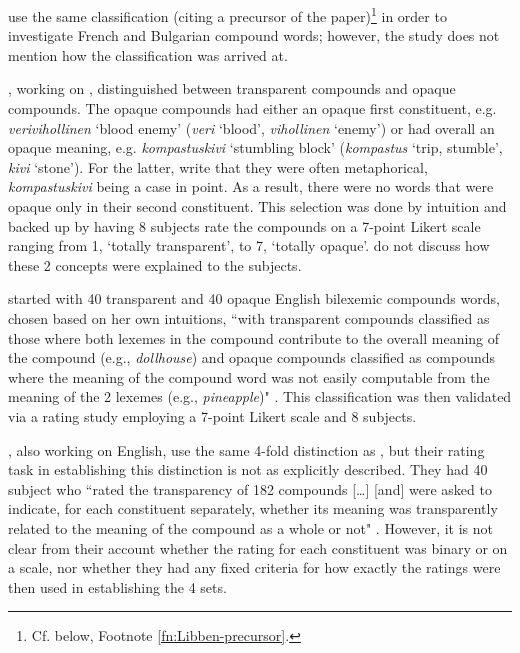 \citet{Jaremaetal:1999} use the same classification (citing a precursor of
the \citet{Libbenetal:2003} paper)\footnote{Cf. below, Footnote \ref{fn:Libben-precursor}.}
in order to investigate
French and Bulgarian compound words; however, the study does not mention how
the classification was arrived at.

\citet{PollatsekandHyona:2005}, working on , distinguished between transparent compounds and
opaque compounds. The opaque compounds had either an opaque first constituent,
e.g. \emph{verivihollinen} `blood enemy' (\emph{veri} `blood', \emph{vihollinen} `enemy') or had overall an opaque meaning,
e.g. \emph{kompastuskivi} `stumbling block' (\emph{kompastus} `trip,
stumble', \emph{kivi} `stone'). 
For the latter,
\citet{PollatsekandHyona:2005} write that they were often
metaphorical, \emph{kompastuskivi} being a case in point. As a
result, there were no words that were opaque only in their second
constituent. This selection was done by intuition and backed up by having 8 subjects rate
the compounds on a 7-point Likert scale ranging from 1, 
`totally transparent', to 7, `totally
opaque'. \citet{PollatsekandHyona:2005} do not discuss how these 2
concepts were explained to the subjects.


\citet{Juhasz:2007} started with 40 transparent and 40 opaque English
bilexemic compounds words, chosen based on her own intuitions, ``with transparent
compounds classified as those where both lexemes in the compound contribute to
the overall meaning of the compound (e.g., \emph{dollhouse}) and opaque
compounds classified as compounds where the meaning of the compound word was
not easily computable from the meaning of the 2 lexemes (e.g.,
\emph{pineapple})" \citep[379]{Juhasz:2007}. This classification was then
validated via a rating study employing a 7-point
Likert scale and 8
subjects. 

\citet{Frissonetal:2008}, also working on English, use the same 4-fold distinction as \citet{Libbenetal:2003}, but
their rating task in establishing this
distinction is not as explicitly described. They had 40 subject who ``rated the transparency of 182 compounds
[\dots ] [and] were asked to indicate, for each constituent separately,
  whether its meaning was transparently related to the meaning of the
  compound as a whole or not" \citep[92]{Frissonetal:2008}. However, it
  is not clear from their account whether the rating for each
  constituent was binary or on a scale, nor whether they had any fixed
  criteria for how exactly the ratings were then used in establishing the 4 sets. 

